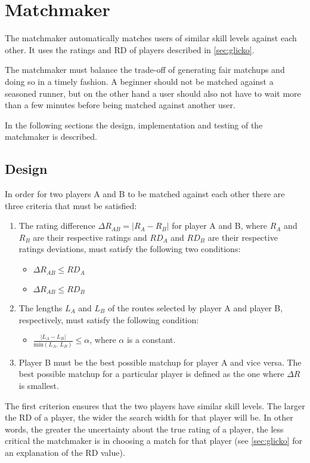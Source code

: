 \section{Matchmaker}
The matchmaker automatically matches users of similar skill levels against each other.
It uses the ratings and RD of players described in \autoref{sec:glicko}.

The matchmaker must balance the trade-off of generating fair matchups and doing so in a timely fashion.
A beginner should not be matched against a seasoned runner, but on the other hand a user should also not have to wait more than a few minutes before being matched against another user.

In the following sections the design, implementation and testing of the matchmaker is described.

\subsection{Design}
In order for two players A and B to be matched against each other there are three criteria that must be satisfied:

\begin{enumerate}
	\item{The rating difference $\Delta R_{AB} = \left|R_A-R_B\right|$ for player A and B, where $R_A$ and $R_B$ are their respective ratings and $RD_A$ and $RD_B$ are their respective ratings deviations, must satisfy the following two conditions:}
		\begin{itemize}
			\item{$\Delta R_{AB} \leq RD_A$}
			\item{$\Delta R_{AB} \leq RD_B$}
		\end{itemize}
	\item{The lengths $L_A$ and $L_B$ of the routes selected by player A and player B, respectively, must satisfy the following condition:}
		\begin{itemize}
			\item{$\frac{\left|L_A-L_B\right|}{\mathrm{min}\left(L_A,\:	L_B\right)} \leq \alpha$, where $\alpha$ is a constant.	}
		\end{itemize}
	\item{Player B must be the best possible matchup for player A and vice versa. The best possible matchup for a particular player is defined as the one where $\Delta R$ is smallest.}
\end{enumerate}

The first criterion ensures that the two players have similar skill levels.
The larger the RD of a player, the wider the search width for that player will be.
In other words, the greater the uncertainty about the true rating of a player, the less critical the matchmaker is in choosing a match for that player (see \autoref{sec:glicko} for an explanation of the RD value).

